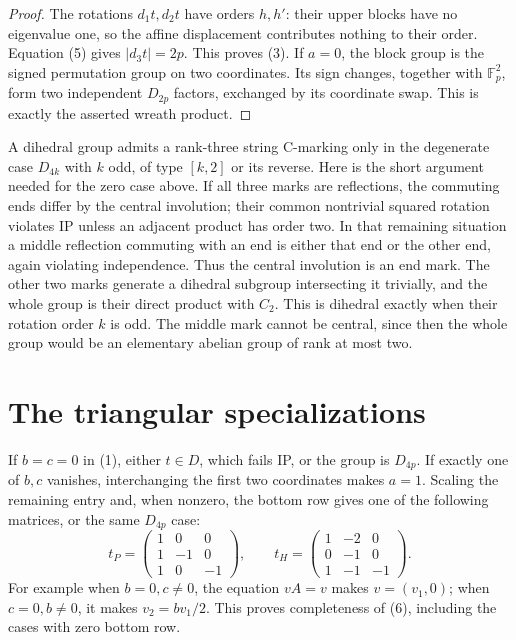 \documentclass[11pt]{article}
\newcommand{\F}{\mathbb F}\newcommand{\gen}[1]{\langle#1\rangle}
\begin{document}
\begin{proof}
The rotations $d_1t,d_2t$ have orders $h,h'$: their upper blocks
have no eigenvalue one, so the affine displacement contributes nothing
to their order. Equation (5) gives $|d_3t|=2p$. This proves (3).
If $a=0$, the block group is the signed permutation group on two
coordinates. Its sign changes, together with $\F_p^2$, form two
independent $D_{2p}$ factors, exchanged by its coordinate swap.
This is exactly the asserted wreath product.
\end{proof}

A dihedral group admits a rank-three string C-marking only in the
degenerate case $D_{4k}$ with $k$ odd, of type $[k,2]$ or its reverse.
Here is the short argument needed for the zero case above. If all three
marks are reflections, the commuting ends differ by the central
involution; their common nontrivial squared rotation violates IP unless
an adjacent product has order two. In that remaining situation a middle
reflection commuting with an end is either that end or the other end,
again violating independence. Thus the central involution is an end
mark. The other two marks generate a dihedral subgroup intersecting
it trivially, and the whole group is their direct product with $C_2$.
This is dihedral exactly when their rotation order $k$ is odd.
The middle mark cannot be central, since then the whole group would be
an elementary abelian group of rank at most two.

\section*{The triangular specializations}
If $b=c=0$ in (1), either $t\in D$, which fails IP, or the group is
$D_{4p}$. If exactly one of $b,c$ vanishes, interchanging the first two
coordinates makes $a=1$. Scaling the remaining entry and, when
nonzero, the bottom row gives one of the following matrices, or the
same $D_{4p}$ case:
\[
 t_P=\begin{pmatrix}1&0&0\\1&-1&0\\1&0&-1\end{pmatrix},\qquad
 t_H=\begin{pmatrix}1&-2&0\\0&-1&0\\1&-1&-1\end{pmatrix}.          \tag{6}
\]
For example when $b=0,c\ne0$, the equation $vA=v$ makes $v=(v_1,0)$;
when $c=0,b\ne0$, it makes $v_2=bv_1/2$. This proves completeness
of (6), including the cases with zero bottom row.
\end{document}
